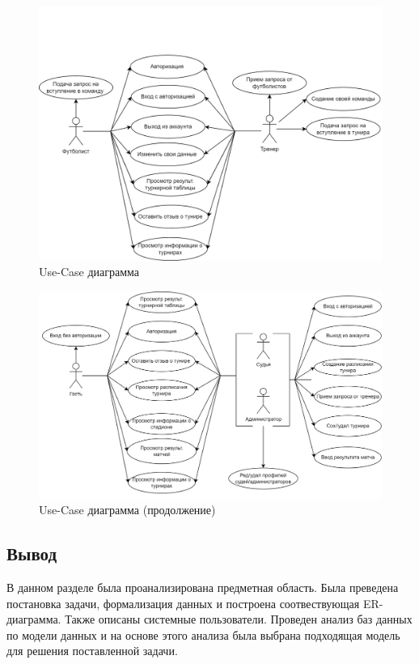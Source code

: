 \begin{figure}[h]
	\centering
	\includegraphics[height=0.3\textheight]{img/ppo-Use-Case1.png}
	\caption{Use-Case диаграмма}
	\label{img:Use-case1}
\end{figure}

\begin{figure}[h]
	\centering
	\includegraphics[height=0.3\textheight]{img/ppo-Use-Case2.png}
	\caption{Use-Case диаграмма (продолжение)}
	\label{img:Use-case2}
\end{figure}

\clearpage

\subsection*{Вывод}
В данном разделе была проанализирована предметная область.
Была преведена постановка задачи, формализация данных и построена соотвествующая ER-диаграмма. 
Также описаны системные пользователи.
Проведен анализ баз данных по модели данных и на основе этого анализа была выбрана подходящая модель для решения поставленной задачи.